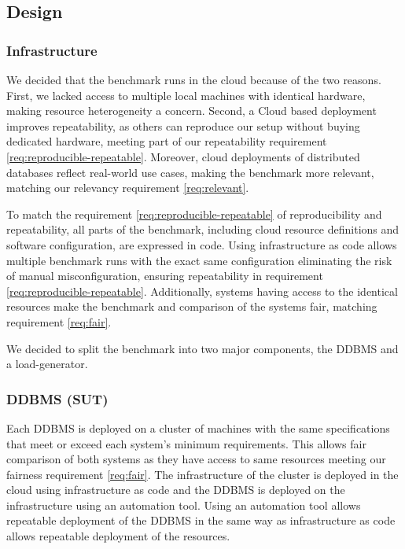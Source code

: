 \subsection{Design}

\subsubsection{Infrastructure}
We decided that the benchmark runs in the cloud because of the two reasons.
First, we lacked access to multiple local machines with identical hardware, making resource heterogeneity a concern.
Second, a Cloud based deployment improves repeatability, as others can reproduce our setup without buying dedicated hardware, meeting part of our repeatability requirement \ref{req:reproducible-repeatable}.
Moreover, cloud deployments of distributed databases reflect real-world use cases, making the benchmark more relevant, matching our relevancy requirement \ref{req:relevant}.

To match the requirement \ref{req:reproducible-repeatable} of reproducibility and repeatability, all parts of the benchmark, including cloud resource definitions and software configuration, are expressed in code.
Using infrastructure as code allows multiple benchmark runs with the exact same configuration eliminating the risk of manual misconfiguration, ensuring repeatability in requirement \ref{req:reproducible-repeatable}.
Additionally, systems having access to the identical resources make the benchmark and comparison of the systems fair, matching requirement \ref{req:fair}.

We decided to split the benchmark into two major components, the DDBMS and a load-generator.

\subsubsection{DDBMS (SUT)}

Each DDBMS is deployed on a cluster of machines with the same specifications that meet or exceed each system's minimum requirements.
This allows fair comparison of both systems as they have access to same resources meeting our fairness requirement \ref{req:fair}.
The infrastructure of the cluster is deployed in the cloud using infrastructure as code and the DDBMS is deployed on the infrastructure using an automation tool.
Using an automation tool allows repeatable deployment of the DDBMS in the same way as infrastructure as code allows repeatable deployment of the resources.


